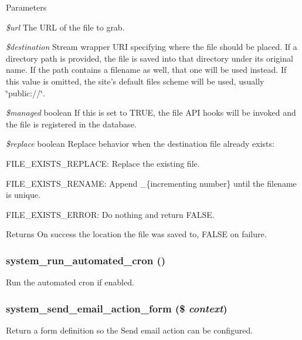 \begin{DoxyParams}{Parameters}
\item[{\em \$url}]The URL of the file to grab.\item[{\em \$destination}]Stream wrapper URI specifying where the file should be placed. If a directory path is provided, the file is saved into that directory under its original name. If the path contains a filename as well, that one will be used instead. If this value is omitted, the site's default files scheme will be used, usually \char`\"{}public://\char`\"{}.\item[{\em \$managed}]boolean If this is set to TRUE, the file API hooks will be invoked and the file is registered in the database.\item[{\em \$replace}]boolean Replace behavior when the destination file already exists:
\begin{DoxyItemize}
\item FILE\_\-EXISTS\_\-REPLACE: Replace the existing file.
\item FILE\_\-EXISTS\_\-RENAME: Append \_\-\{incrementing number\} until the filename is unique.
\item FILE\_\-EXISTS\_\-ERROR: Do nothing and return FALSE.
\end{DoxyItemize}\end{DoxyParams}
\begin{DoxyReturn}{Returns}
On success the location the file was saved to, FALSE on failure. 
\end{DoxyReturn}
\hypertarget{system_8module_a1fa48b8c19dfe32cfd122c0dd5661a88}{
\subsubsection[{system\_\-run\_\-automated\_\-cron}]{\setlength{\rightskip}{0pt plus 5cm}system\_\-run\_\-automated\_\-cron ()}}
\label{system_8module_a1fa48b8c19dfe32cfd122c0dd5661a88}
Run the automated cron if enabled. \hypertarget{system_8module_acdc88b46eee866f535e90f0cb9a6114a}{
\subsubsection[{system\_\-send\_\-email\_\-action\_\-form}]{\setlength{\rightskip}{0pt plus 5cm}system\_\-send\_\-email\_\-action\_\-form (\$ {\em context})}}
\label{system_8module_acdc88b46eee866f535e90f0cb9a6114a}
Return a form definition so the Send email action can be configured.


